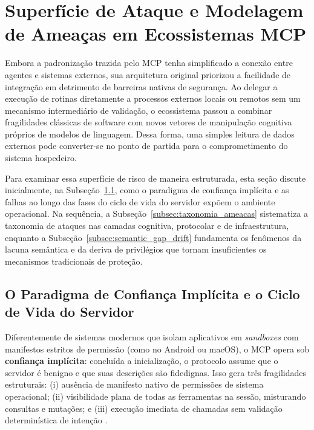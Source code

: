 \section{Superfície de Ataque e Modelagem de Ameaças em Ecossistemas MCP}
\label{sec:superficie_ameacas}

Embora a padronização trazida pelo MCP tenha simplificado a conexão entre agentes e sistemas externos, sua arquitetura original priorizou a facilidade de integração em detrimento de barreiras nativas de segurança. Ao delegar a execução de rotinas diretamente a processos externos locais ou remotos sem um mecanismo intermediário de validação, o ecossistema passou a combinar fragilidades clássicas de software com novos vetores de manipulação cognitiva próprios de modelos de linguagem. Dessa forma, uma simples leitura de dados externos pode converter-se no ponto de partida para o comprometimento do sistema hospedeiro.

Para examinar essa superfície de risco de maneira estruturada, esta seção discute inicialmente, na Subseção~\ref{subsec:confianca_ciclodevida}, como o paradigma de confiança implícita e as falhas ao longo das fases do ciclo de vida do servidor expõem o ambiente operacional. Na sequência, a Subseção~\ref{subsec:taxonomia_ameacas} sistematiza a taxonomia de ataques nas camadas cognitiva, protocolar e de infraestrutura, enquanto a Subseção~\ref{subsec:semantic_gap_drift} fundamenta os fenômenos da lacuna semântica e da deriva de privilégios que tornam insuficientes os mecanismos tradicionais de proteção.

\subsection{O Paradigma de Confiança Implícita e o Ciclo de Vida do Servidor}
\label{subsec:confianca_ciclodevida}

Diferentemente de sistemas modernos que isolam aplicativos em \textit{sandboxes} com manifestos estritos de permissão (como no Android ou macOS), o MCP opera sob \textbf{confiança implícita}: concluída a inicialização, o protocolo assume que o servidor é benigno e que suas descrições são fidedignas. Isso gera três fragilidades estruturais: (i) ausência de manifesto nativo de permissões de sistema operacional; (ii) visibilidade plana de todas as ferramentas na sessão, misturando consultas e mutações; e (iii) execução imediata de chamadas  sem validação determinística de intenção \cite{buhler2026agentbound,singh2026mcpsecure}.

